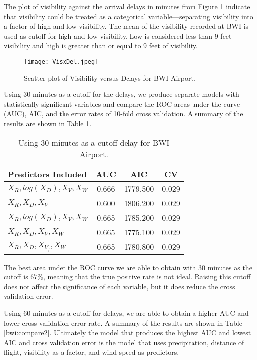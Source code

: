 \documentclass{asaproc}
\begin{document}
The plot of visibility against the arrival delays in minutes from Figure \ref{fig:scatterbwi} indicate that visibility could be treated as a categorical variable---separating visibility into a factor of high and low visibility. The mean of the visibility recorded at BWI is used as cutoff for high and low visibility. Low is considered less than 9 feet visibility and high is greater than or equal to 9 feet of visibility. 

\begin{figure}[h]
    \centering
    \texttt{[image: VisxDel.jpeg]}
    \caption{Scatter plot of Visibility versus Delays for BWI Airport.}
    \label{fig:scatterbwi}
\end{figure}

Using 30 minutes as a cutoff for the delays, we produce separate models with statistically significant variables and compare the ROC areas under the curve (AUC), AIC, and the error rates of 10-fold cross validation. A summary of the results are shown in Table \ref{bwi:compare}.

\begin{table}[H]
\caption{Using 30 minutes as a cutoff delay for BWI Airport.}\label{bwi:compare}
\centering
\begin{tabular}{|l||c|c|c|}
\hline
Predictors Included & AUC & AIC & CV\\
\hline
\hline
$X_R, log(X_D), X_V, X_W$ &  0.666 & 1779.500 &  0.029 \\
\hline
$X_R, X_D, X_V$ & 0.600 & 1806.200 &  0.029 \\
\hline
$X_R, log(X_D), X_V, X_W$ & 0.665 & 1785.200 &  0.029 \\
\hline
$X_R, X_D, X_V, X_W$ & 0.665 & 1775.100 & 0.029 \\
\hline
$X_R, X_D, X_{V_f}, X_W$ & 0.665 & 1780.800 & 0.029 \\
\hline
\end{tabular}
\end{table}

The best area under the ROC curve we are able to obtain with 30 minutes as the cutoff is $67\%$, meaning that the true positive rate is not ideal. Raising this cutoff does not affect the significance of each variable, but it does reduce the cross validation error. 

Using 60 minutes as a cutoff for delays, we are able to obtain a higher AUC and lower cross validation error rate. A summary of the results are shown in Table \ref{bwi:compare2}. Ultimately the model that produces the highest AUC and lowest AIC and cross validation error is the model that uses precipitation, distance of flight, visibility as a factor, and wind speed as predictors.
\end{document}
